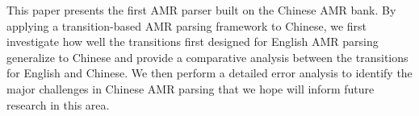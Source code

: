 This paper presents the first AMR parser built on the Chinese AMR bank. By applying a transition-based AMR parsing framework to Chinese, we first investigate how well the transitions first designed for English AMR parsing generalize to Chinese and provide a comparative analysis between the transitions for English and Chinese. We then perform a detailed error analysis to identify the major challenges in Chinese AMR parsing that we hope will inform future research in this area.
